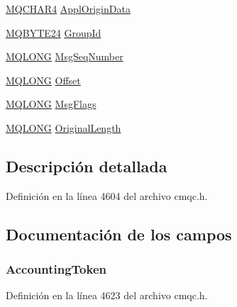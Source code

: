 \begin{DoxyCompactItemize}
\item 
\hyperlink{cmqc_8h_a12590e546ed66fda7cf21c1d5cefa31d}{M\+Q\+C\+H\+A\+R4} \hyperlink{structtag_m_q_m_d2_aaf3c543f992b06c609193929872b998a}{Appl\+Origin\+Data}
\item 
\hyperlink{cmqc_8h_a2866d93c0ef84cfcda34cab5fd22fc5a}{M\+Q\+B\+Y\+T\+E24} \hyperlink{structtag_m_q_m_d2_abcf7ab1abd1c768c0adb9acb3d09c6f1}{Group\+Id}
\item 
\hyperlink{cmqc_8h_a1fb8d28cbda3fa8766a9821230cdb6d5}{M\+Q\+L\+O\+N\+G} \hyperlink{structtag_m_q_m_d2_a7c78a4f7c1bbda9f124f904e0d02a7a2}{Msg\+Seq\+Number}
\item 
\hyperlink{cmqc_8h_a1fb8d28cbda3fa8766a9821230cdb6d5}{M\+Q\+L\+O\+N\+G} \hyperlink{structtag_m_q_m_d2_aac8433c970f16a602e3b79400e87d28b}{Offset}
\item 
\hyperlink{cmqc_8h_a1fb8d28cbda3fa8766a9821230cdb6d5}{M\+Q\+L\+O\+N\+G} \hyperlink{structtag_m_q_m_d2_a10cb94bb1b2528f6ad936454455bb40a}{Msg\+Flags}
\item 
\hyperlink{cmqc_8h_a1fb8d28cbda3fa8766a9821230cdb6d5}{M\+Q\+L\+O\+N\+G} \hyperlink{structtag_m_q_m_d2_acf39c0c6d2618f565cf8315c8775b5ae}{Original\+Length}
\end{DoxyCompactItemize}


\subsection{Descripción detallada}


Definición en la línea 4604 del archivo cmqc.\+h.



\subsection{Documentación de los campos}
\hypertarget{structtag_m_q_m_d2_a1fe2835a002ec01b58d479509699dd2c}{}
\subsubsection[{Accounting\+Token}]{ Accounting\+Token}\label{structtag_m_q_m_d2_a1fe2835a002ec01b58d479509699dd2c}


Definición en la línea 4623 del archivo cmqc.\+h.

\hypertarget{structtag_m_q_m_d2_a1f16948c5ba6adfbb92776400030700e}{}
